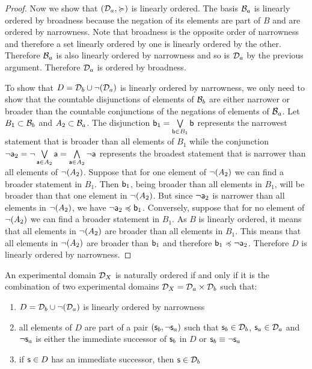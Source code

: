 \documentclass[11pt,letterpaper,fleqn]{memoir} %
\begin{document}
\begin{mathSection}
\begin{proof}
	Now we show that $(\edomain_a, \broader)$ is linearly ordered. The basis $\basis_a$ is linearly ordered by broadness because the negation of its elements are part of $B$ and are ordered by narrowness. Note that broadness is the opposite order of narrowness and therefore a set linearly ordered by one is linearly ordered by the other. Therefore $\basis_a$ is also linearly ordered by narrowness and so is $\edomain_a$ by the previous argument. Therefore $\edomain_a$ is ordered by broadness.
	
	To show that $D=\edomain_b \cup \NOT (\edomain_a)$ is linearly ordered by narrowness, we only need to show that the countable disjunctions of elements of $\basis_b$ are either narrower or broader than the countable conjunctions of the negations of elements of $\basis_a$. Let $B_1 \subset \basis_b$ and $A_2 \subset \basis_a$. The disjunction $\stmt[b]_1 = \bigOR\limits_{\stmt[b] \in B_1} \stmt[b]$ represents the narrowest statement that is broader than all elements of $B_1$ while the conjunction $\NOT \stmt[a]_2 = \NOT \bigOR\limits_{\stmt[a] \in A_2} \stmt[a] = \bigAND\limits_{\stmt[a] \in A_2} \NOT \stmt[a]$ represents the broadest statement that is narrower than all elements of $\NOT(A_2)$. Suppose that for one element of $\NOT(A_2)$ we can find a broader statement in $B_1$. Then $\stmt[b]_1$, being broader than all elements in $B_1$, will be broader than that one element in $\NOT(A_2)$. But since $\NOT \stmt[a]_2$ is narrower than all elements in $\NOT(A_2)$, we have $\NOT \stmt[a]_2 \narrower \stmt[b]_1$. Conversely, suppose that for no element of $\NOT(A_2)$ we can find a broader statement in $B_1$. As $B$ is linearly ordered, it means that all elements in $\NOT(A_2)$ are broader than all elements in $B_1$. This means that all elements in $\NOT(A_2)$ are broader than $\stmt[b]_1$ and therefore $\stmt[b]_1 \narrower \NOT \stmt[a]_2$. Therefore $D$ is linearly ordered by narrowness.
\end{proof}

\begin{thrm}\label{3_thrm_domain_ordering_theorem}
	An experimental domain $\edomain_X$ is naturally ordered if and only if it is the combination of two experimental domains $\edomain_X = \edomain_a \times \edomain_b$ such that:
	\begin{enumerate}[label=(\roman*)]
		\item $D = \edomain_b \cup \NOT(\edomain_a)$ is linearly ordered by narrowness
		\item all elements of $D$ are part of a pair $(\stmt_b, \NOT \stmt_a)$ such that $\stmt_b \in \edomain_b$, $\stmt_a \in \edomain_a$ and $\NOT \stmt_a$ is either the immediate successor of $\stmt_b$ in $D$ or $\stmt_b \equiv \NOT \stmt_a$
		\item if $\stmt \in D$ has an immediate successor, then $\stmt \in \edomain_b$
	\end{enumerate}
\end{thrm}


\end{mathSection}
\end{document}
